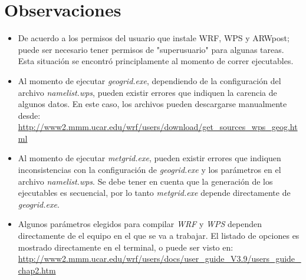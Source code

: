 \documentclass[12pt,letter]{article}
\begin{document}
\section*{Observaciones}
\begin{itemize}
\item De acuerdo a los permisos del usuario que instale WRF, WPS y ARWpost; puede ser necesario tener permisos de "superusuario" para algunas tareas. Esta situaci\'on se encontr\'o principlamente al momento de correr ejecutables.

\item Al momento de ejecutar \textit{geogrid.exe}, dependiendo de la configuraci\'on del archivo \textit{namelist.wps}, pueden existir errores que indiquen la carencia de algunos datos. En este caso, los archivos pueden descargarse manualmente desde: \url{http://www2.mmm.ucar.edu/wrf/users/download/get_sources_wps_geog.html}

\item Al momento de ejecutar \textit{metgrid.exe}, pueden existir errores que indiquen inconsistencias con la configuraci\'on de \textit{geogrid.exe} y los par\'ametros en el archivo \textit{namelist.wps}. Se debe tener en cuenta que la generaci\'on de los ejecutables es secuencial, por lo tanto \textit{metgrid.exe} depende directamente de \textit{geogrid.exe}.

\item Algunos par\'ametros elegidos para compilar \textit{WRF} y \textit{WPS} dependen directamente de el equipo en el que se va a trabajar. El listado de opciones es mostrado directamente en el terminal, o puede ser visto en: \url{http://www2.mmm.ucar.edu/wrf/users/docs/user_guide_V3.9/users_guide_chap2.htm}
\end{itemize}
\end{document}
